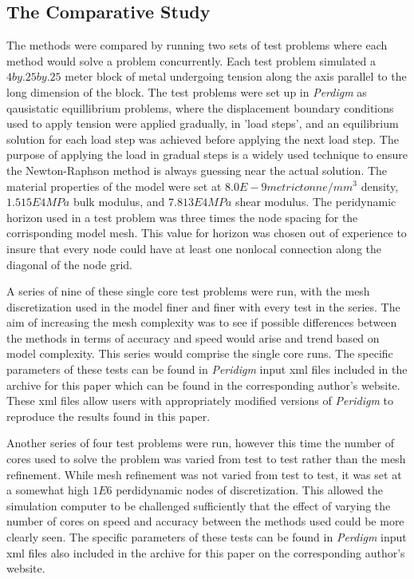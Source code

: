 \documentclass[preprint,12pt]{elsarticle}
\begin{document}
\subsection{The Comparative Study} 
\label{tcs}

The methods were compared by running two sets of test problems where each method would solve a
problem concurrently. Each test problem simulated a $4 by .25 by .25$ meter block of metal
undergoing tension along the axis parallel to the long dimension of the block. The test problems
were set up in \emph{Perdigm} as qausistatic equillibrium problems, where the displacement boundary
conditions used to apply tension were applied gradually, in 'load steps', and an equilibrium
solution for each load step was achieved before applying the next load step. The purpose of applying
the load in gradual steps is a widely used technique to ensure the Newton-Raphson method is always
guessing near the actual solution. The material properties of the model were set at $8.0E-9 metric
tonne/ mm^3$ density, $1.515E4 MPa$ bulk modulus, and $7.813E4 MPa$ shear modulus. The peridynamic
horizon used in a test problem was three times the node spacing for the corrisponding model mesh.
This value for horizon was chosen out of experience to insure that every node could have at least
one nonlocal connection along the diagonal of the node grid.

A series of nine of these single core test problems were run, with the mesh discretization used in
the model finer and finer with every test in the series. The aim of increasing the mesh complexity
was to see if possible differences between the methods in terms of accuracy and speed would arise
and trend based on model complexity. This series would comprise the single core runs. The specific
parameters of these tests can be found in \emph{Peridigm} input xml files included in the archive
for this paper which can be found in the corresponding author's website. These xml files allow users
with appropriately modified versions of \emph{Peridigm} to reproduce the results found in this
paper.

Another series of four test problems were run, however this time the number of cores used to solve
the problem was varied from test to test rather than the mesh refinement. While mesh refinement was
not varied from test to test, it was set at a somewhat high $1E6$ perdidynamic nodes of
discretization. This allowed the simulation computer to be challenged sufficiently that the effect
of varying the number of cores on speed and accuracy between the methods used could be more clearly
seen. The specific parameters of these tests can be found in \emph{Perdigm} input xml files also
included in the archive for this paper on the corresponding author's website.
\end{document}
